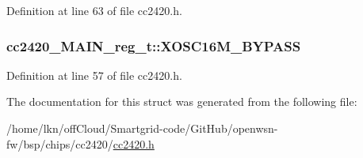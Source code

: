 Definition at line 63 of file cc2420.\+h.

\subsubsection[{\texorpdfstring{X\+O\+S\+C16\+M\+\_\+\+B\+Y\+P\+A\+SS}{XOSC16M_BYPASS}}]{ cc2420\+\_\+\+M\+A\+I\+N\+\_\+reg\+\_\+t\+::\+X\+O\+S\+C16\+M\+\_\+\+B\+Y\+P\+A\+SS}\hypertarget{structcc2420___m_a_i_n__reg__t_ace5da77e8fc9d86705cd6db2680ff631}{}\label{structcc2420___m_a_i_n__reg__t_ace5da77e8fc9d86705cd6db2680ff631}


Definition at line 57 of file cc2420.\+h.



The documentation for this struct was generated from the following file\+:\begin{DoxyCompactItemize}
\item 
/home/lkn/off\+Cloud/\+Smartgrid-\/code/\+Git\+Hub/openwsn-\/fw/bsp/chips/cc2420/\hyperlink{cc2420_8h}{cc2420.\+h}\end{DoxyCompactItemize}
